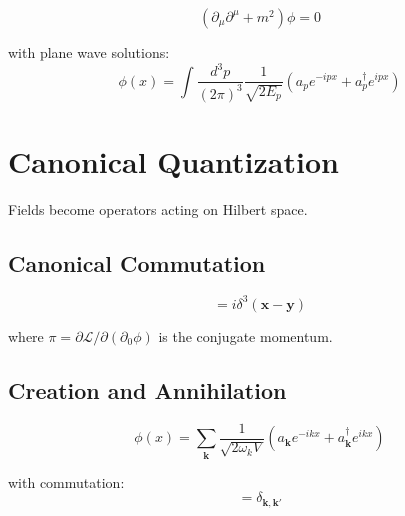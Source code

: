 \begin{proposition}
\label{fa_21:prop:kg-eq}
\begin{equation}
(\partial_\mu\partial^\mu + m^2)\phi = 0
\end{equation}

with plane wave solutions:
\begin{equation}
\phi(x) = \int \frac{d^3p}{(2\pi)^3}\frac{1}{\sqrt{2E_p}}(a_p e^{-ipx} + a_p^\dagger e^{ipx})
\end{equation}
\end{proposition}

\section{Canonical Quantization}

Fields become operators acting on Hilbert space.

\subsection{Canonical Commutation}

\begin{definition}
\label{fa_21:def:field-ops}
\begin{equation}
[\phi(t,\mathbf{x}), \pi(t,\mathbf{y})] = i\delta^3(\mathbf{x}-\mathbf{y})
\end{equation}

where $\pi = \partial\mathcal{L}/\partial(\partial_0\phi)$ is the conjugate momentum.
\end{definition}

\subsection{Creation and Annihilation}

\begin{theorem}
\label{fa_21:thm:mode-expansion}
\begin{equation}
\phi(x) = \sum_{\mathbf{k}}\frac{1}{\sqrt{2\omega_k V}}(a_{\mathbf{k}} e^{-ikx} + a_{\mathbf{k}}^\dagger e^{ikx})
\end{equation}

with commutation:
\begin{equation}
[a_{\mathbf{k}}, a_{\mathbf{k}'}^\dagger] = \delta_{\mathbf{k},\mathbf{k}'}
\end{equation}
\end{theorem}

